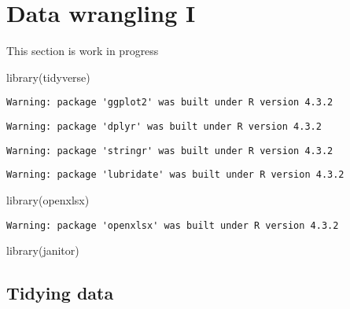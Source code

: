 \documentclass[
  letterpaper,
  DIV=11,
  numbers=noendperiod]{scrreprt}
\newenvironment{Shaded}{\begin{snugshade}}{\end{snugshade}}
\newcommand{\FunctionTok}[1]{\textcolor[rgb]{0.28,0.35,0.67}{#1}}
\newcommand{\NormalTok}[1]{\textcolor[rgb]{0.00,0.23,0.31}{#1}}
\begin{document}

\hypertarget{data-wrangling-i}{%
\chapter{Data wrangling I}\label{data-wrangling-i}}

This section is work in progress

\begin{Shaded}
\begin{Highlighting}[]
\FunctionTok{library}\NormalTok{(tidyverse)}
\end{Highlighting}
\end{Shaded}

\begin{verbatim}
Warning: package 'ggplot2' was built under R version 4.3.2
\end{verbatim}

\begin{verbatim}
Warning: package 'dplyr' was built under R version 4.3.2
\end{verbatim}

\begin{verbatim}
Warning: package 'stringr' was built under R version 4.3.2
\end{verbatim}

\begin{verbatim}
Warning: package 'lubridate' was built under R version 4.3.2
\end{verbatim}

\begin{Shaded}
\begin{Highlighting}[]
\FunctionTok{library}\NormalTok{(openxlsx)}
\end{Highlighting}
\end{Shaded}

\begin{verbatim}
Warning: package 'openxlsx' was built under R version 4.3.2
\end{verbatim}

\begin{Shaded}
\begin{Highlighting}[]
\FunctionTok{library}\NormalTok{(janitor)}
\end{Highlighting}
\end{Shaded}

\hypertarget{tidying-data}{%
\section{Tidying data}\label{tidying-data}}
\end{document}
